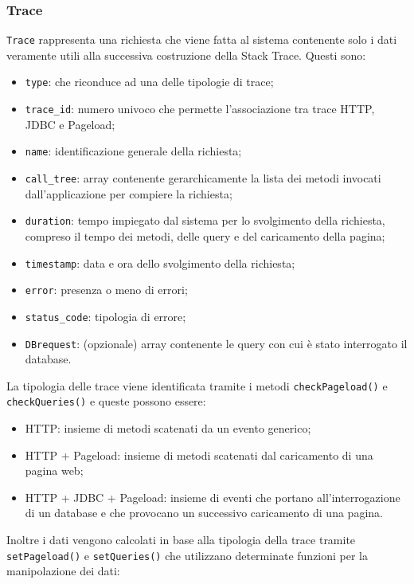 \subsubsection{Trace}
\label{sec:Trace}
\texttt{Trace} rappresenta una richiesta che viene fatta al sistema contenente solo i dati veramente utili alla successiva costruzione della Stack Trace. Questi sono:
\begin{itemize}
	\item \texttt{type}: che riconduce ad una delle tipologie di trace;
	\item \texttt{trace\_id}: numero univoco che permette l'associazione tra trace HTTP, JDBC e Pageload;
	\item \texttt{name}: identificazione generale della richiesta;
	\item \texttt{call\_tree}: array contenente gerarchicamente la lista dei metodi invocati dall'applicazione per compiere la richiesta;
	\item \texttt{duration}: tempo impiegato dal sistema per lo svolgimento della richiesta, compreso il tempo dei metodi, delle query e del caricamento della pagina;
	\item \texttt{timestamp}: data e ora dello svolgimento della richiesta;
	\item \texttt{error}: presenza o meno di errori;
	\item \texttt{status\_code}: tipologia di errore;
	\item \texttt{DBrequest}: (opzionale) array contenente le query con cui è stato interrogato il database.
\end{itemize}
 La tipologia delle trace viene identificata tramite i metodi \texttt{checkPageload()} e \texttt{checkQueries()} e queste possono essere:
	\begin{itemize}
	\item HTTP: insieme di metodi scatenati da un evento generico;
	\item HTTP + Pageload: insieme di metodi scatenati dal caricamento di una pagina web;
	\item HTTP + JDBC + Pageload: insieme di eventi che portano all'interrogazione di un database e che provocano un successivo caricamento di una pagina.
	\end{itemize}
Inoltre i dati vengono calcolati in base alla tipologia della trace tramite  \texttt{setPageload()} e  \texttt{setQueries()} che utilizzano determinate funzioni per la manipolazione dei dati:
